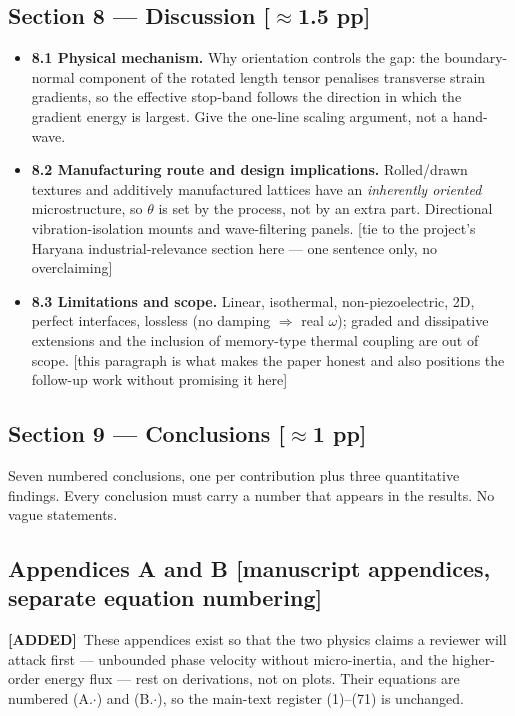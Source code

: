 \documentclass[11pt,a4paper]{article}
\newcommand{\bp}[1]{\textcolor{accent}{\textsf{\footnotesize [#1]}}}
\newcommand{\ADDED}{{\color{addcol}\textbf{[ADDED]}}}
\begin{document}
\subsection{Section 8 --- Discussion \bp{$\approx$1.5 pp}}
\begin{itemize}
\item \textbf{8.1 Physical mechanism.} Why orientation controls the gap: the boundary-normal component of the rotated length tensor penalises transverse strain gradients, so the effective stop-band follows the direction in which the gradient energy is largest. Give the one-line scaling argument, not a hand-wave.
\item \textbf{8.2 Manufacturing route and design implications.} Rolled/drawn textures and additively manufactured lattices have an \emph{inherently oriented} microstructure, so $\theta$ is set by the process, not by an extra part. Directional vibration-isolation mounts and wave-filtering panels. \bp{tie to the project's Haryana industrial-relevance section here --- one sentence only, no overclaiming}
\item \textbf{8.3 Limitations and scope.} Linear, isothermal, non-piezoelectric, 2D, perfect interfaces, lossless (no damping $\Rightarrow$ real $\omega$); graded and dissipative extensions and the inclusion of memory-type thermal coupling are out of scope. \bp{this paragraph is what makes the paper honest and also positions the follow-up work without promising it here}
\end{itemize}

\subsection{Section 9 --- Conclusions \bp{$\approx$1 pp}}
Seven numbered conclusions, one per contribution plus three quantitative findings.
Every conclusion must carry a number that appears in the results. No vague statements.

\subsection{Appendices A and B \bp{manuscript appendices, separate equation numbering}}

\ADDED\ These appendices exist so that the two physics claims a reviewer will attack
first --- unbounded phase velocity without micro-inertia, and the higher-order energy
flux --- rest on derivations, not on plots. Their equations are numbered (A.$\cdot$) and
(B.$\cdot$), so the main-text register (1)--(71) is unchanged.
\end{document}
